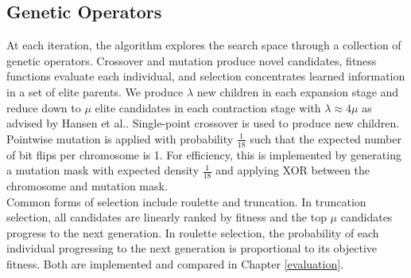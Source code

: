 \subsection{Genetic Operators}
At each iteration, the algorithm explores the search space through a collection of genetic operators. Crossover and mutation produce novel candidates, fitness functions evaluate each individual, and selection concentrates learned information in a set of elite parents. We produce $\lambda$ new children in each expansion stage and reduce down to $\mu$ elite candidates in each contraction stage with $\lambda \approx 4\mu$ as advised by Hansen et al.\cite{hansen2015evolution}. Single-point crossover is used to produce new children. Pointwise mutation is applied with probability $\frac{1}{18}$ such that the expected number of bit flips per chromosome is 1. For efficiency, this is implemented by generating a mutation mask with expected density $\frac{1}{18}$ and applying XOR between the chromosome and mutation mask.\\


Common forms of selection include roulette and truncation. In truncation selection, all candidates are linearly ranked by fitness and the top $\mu$ candidates progress to the next generation. In roulette selection, the probability of each individual progressing to the next generation is proportional to its objective fitness. Both are implemented and compared in Chapter \ref{evaluation}.

